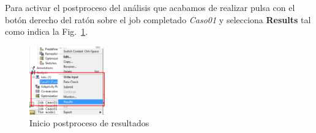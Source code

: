 Para activar el postproceso del análisis que acabamos de realizar
pulsa con el botón derecho del ratón sobre el job completado
\textit{Caso01} y selecciona \textbf{Results} tal como indica la
Fig.~\ref{figu70}.
\begin{figure}[H]
  \centering
  \includegraphics[width=0.29\textwidth]{./body/images/imagen70.pdf}
  \caption{Inicio postproceso de resultados}
  \label{figu70}
\end{figure}

